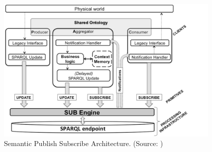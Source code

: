 \documentclass[11pt]{article}
\begin{document}
\begin{figure}[H]
	\includegraphics[width=\textwidth,height=200pt]{assets/SPS_Architecture.png}
	\caption[Semantic Publish Subscribe Architecture]{
	Semantic Publish Subscribe Architecture. (Source: \cite{A-Semantic-Publish-Subscribe-Architecture})}
	\label{fig:Semantic-Publish-Subscribe-Architecture}
\end{figure}
\end{document}
